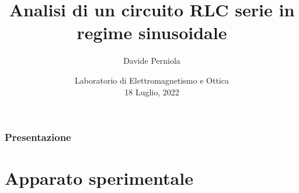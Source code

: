 \documentclass[
	11pt, %
]{beamer}
\title[RLC sinusoidale]{Analisi di un circuito RLC serie in regime sinusoidale} %
\subtitle{} %
\author[Davide Perniola]{Davide Perniola} %
\date[18 Luglio, 2022]{Laboratorio di Elettromagnetismo e Ottica \\ 18 Luglio, 2022} %
\begin{document}

\begin{frame}
	\titlepage %
\end{frame}



\begin{frame}
	\frametitle{Presentazione} %
	
	\tableofcontents %
\end{frame}


\section{Apparato sperimentale} %
	
\end{document}
